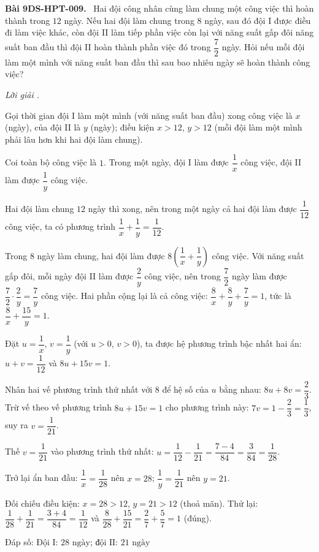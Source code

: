 \documentclass[12pt,a4paper]{article}
\newenvironment{problem}[1][]{\par\medskip\noindent\textbf{Bài #1.}\ }{\par}
\newenvironment{solution}[1][]{\par\noindent\textit{Lời giải #1.}\par}{\par}
\begin{document}
\begin{problem}[9DS-HPT-009]
Hai đội công nhân cùng làm chung một công việc thì hoàn thành trong $12$ ngày. Nếu hai đội làm chung trong $8$ ngày, sau đó đội I được điều đi làm việc khác, còn đội II làm tiếp phần việc còn lại với năng suất gấp đôi năng suất ban đầu thì đội II hoàn thành phần việc đó trong $\dfrac{7}{2}$ ngày. Hỏi nếu mỗi đội làm một mình với năng suất ban đầu thì sau bao nhiêu ngày sẽ hoàn thành công việc?

\begin{solution}
Gọi thời gian đội I làm một mình (với năng suất ban đầu) xong công việc là $x$ (ngày), của đội II là $y$ (ngày); điều kiện $x > 12$, $y > 12$ (mỗi đội làm một mình phải lâu hơn khi hai đội làm chung).

Coi toàn bộ công việc là $1$. Trong một ngày, đội I làm được $\dfrac{1}{x}$ công việc, đội II làm được $\dfrac{1}{y}$ công việc.

Hai đội làm chung $12$ ngày thì xong, nên trong một ngày cả hai đội làm được $\dfrac{1}{12}$ công việc, ta có phương trình $\dfrac{1}{x} + \dfrac{1}{y} = \dfrac{1}{12}$.

Trong $8$ ngày làm chung, hai đội làm được $8\left(\dfrac{1}{x} + \dfrac{1}{y}\right)$ công việc. Với năng suất gấp đôi, mỗi ngày đội II làm được $\dfrac{2}{y}$ công việc, nên trong $\dfrac{7}{2}$ ngày làm được $\dfrac{7}{2} \cdot \dfrac{2}{y} = \dfrac{7}{y}$ công việc. Hai phần cộng lại là cả công việc: $\dfrac{8}{x} + \dfrac{8}{y} + \dfrac{7}{y} = 1$, tức là $\dfrac{8}{x} + \dfrac{15}{y} = 1$.

Đặt $u = \dfrac{1}{x}$, $v = \dfrac{1}{y}$ (với $u > 0$, $v > 0$), ta được hệ phương trình bậc nhất hai ẩn: $u + v = \dfrac{1}{12}$ và $8u + 15v = 1$.

Nhân hai vế phương trình thứ nhất với $8$ để hệ số của $u$ bằng nhau: $8u + 8v = \dfrac{2}{3}$. Trừ vế theo vế phương trình $8u + 15v = 1$ cho phương trình này: $7v = 1 - \dfrac{2}{3} = \dfrac{1}{3}$, suy ra $v = \dfrac{1}{21}$.

Thế $v = \dfrac{1}{21}$ vào phương trình thứ nhất: $u = \dfrac{1}{12} - \dfrac{1}{21} = \dfrac{7 - 4}{84} = \dfrac{3}{84} = \dfrac{1}{28}$.

Trở lại ẩn ban đầu: $\dfrac{1}{x} = \dfrac{1}{28}$ nên $x = 28$; $\dfrac{1}{y} = \dfrac{1}{21}$ nên $y = 21$.

Đối chiếu điều kiện: $x = 28 > 12$, $y = 21 > 12$ (thoả mãn). Thử lại: $\dfrac{1}{28} + \dfrac{1}{21} = \dfrac{3 + 4}{84} = \dfrac{1}{12}$ và $\dfrac{8}{28} + \dfrac{15}{21} = \dfrac{2}{7} + \dfrac{5}{7} = 1$ (đúng).

Đáp số: $\boxed{\text{Đội I: } 28 \text{ ngày; đội II: } 21 \text{ ngày}}$
\end{solution}
\end{problem}
\end{document}
